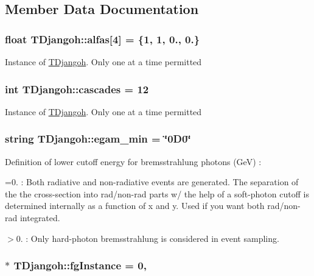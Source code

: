 \subsection{Member Data Documentation}
\hypertarget{class_t_djangoh_a74cbc9b27daed09c9b853b2f72669a71}{
\subsubsection[{alfas}]{\setlength{\rightskip}{0pt plus 5cm}float T\+Djangoh\+::alfas\mbox{[}4\mbox{]} = \{1, 1, 0., 0.\}}}\label{class_t_djangoh_a74cbc9b27daed09c9b853b2f72669a71}
Instance of \hyperlink{class_t_djangoh}{T\+Djangoh}. Only one at a time permitted \hypertarget{class_t_djangoh_a804083301c1acef844fa78a2c36fdf32}{
\subsubsection[{cascades}]{\setlength{\rightskip}{0pt plus 5cm}int T\+Djangoh\+::cascades = 12}}\label{class_t_djangoh_a804083301c1acef844fa78a2c36fdf32}
Instance of \hyperlink{class_t_djangoh}{T\+Djangoh}. Only one at a time permitted \hypertarget{class_t_djangoh_a942fe7661f7ca2e6e94eefc7efc8b523}{
\subsubsection[{egam\+\_\+min}]{\setlength{\rightskip}{0pt plus 5cm}string T\+Djangoh\+::egam\+\_\+min = \char`\"{}0\+D0\char`\"{}}}\label{class_t_djangoh_a942fe7661f7ca2e6e94eefc7efc8b523}
Definition of lower cutoff energy for bremsstrahlung photons (Ge\+V) \+:
\begin{DoxyItemize}
\item =0. \+: Both radiative and non-\/radiative events are generated. The separation of the the cross-\/section into rad/non-\/rad parts w/ the help of a soft-\/photon cutoff is determined internally as a function of x and y. Used if you want both rad/non-\/rad integrated.
\item $>$0. \+: Only hard-\/photon bremsstrahlung is considered in event sampling. 
\end{DoxyItemize}\hypertarget{class_t_djangoh_ad154e9fce28f84ab490dc6508db58fb8}{
\subsubsection[{fg\+Instance}]{ $\ast$ T\+Djangoh\+::fg\+Instance = 0\hspace{0.3cm}{\ttfamily [static]}, {\ttfamily [protected]}}}\label{class_t_djangoh_ad154e9fce28f84ab490dc6508db58fb8}
